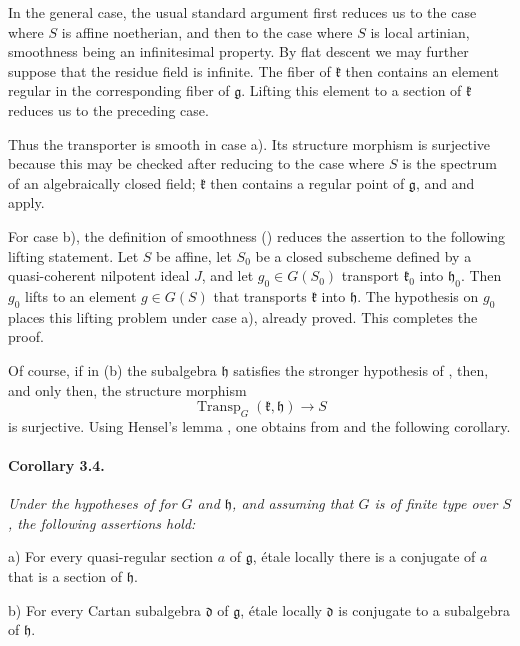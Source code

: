 In the general case, the usual standard argument first reduces us
to the case where \(S\) is affine noetherian, and then to the case
where \(S\) is local artinian, smoothness being an infinitesimal
property. By flat descent we may further suppose that the residue
field is infinite. The fiber of \(\mathfrak k\) then contains an
element regular in the corresponding fiber of \(\mathfrak g\).
Lifting this element to a section of \(\mathfrak k\) reduces us to
the preceding case.

Thus the transporter is smooth in case \textup{a)}. Its structure
morphism is surjective because this may be checked after reducing to
the case where \(S\) is the spectrum of an algebraically closed
field; \(\mathfrak k\) then contains a regular point of
\(\mathfrak g\), and  and  apply.

For case \textup{b)}, the definition of smoothness \textup{()}
reduces the assertion to the following lifting statement. Let \(S\)
be affine, let \(S_0\) be a closed subscheme defined by a
quasi-coherent nilpotent ideal \(J\), and let
\(g_0\in G(S_0)\) transport \(\mathfrak k_0\) into
\(\mathfrak h_0\). Then \(g_0\) lifts to an element \(g\in G(S)\)
that transports \(\mathfrak k\) into \(\mathfrak h\). The
hypothesis on \(g_0\) places this lifting problem under case
\textup{a)}, already proved. This completes the proof.

Of course, if in \textup{(b)} the subalgebra \(\mathfrak h\)
satisfies the stronger hypothesis of , then, and only then, the
structure morphism
\[
  \operatorname{Transp}_G(\mathfrak k,\mathfrak h)
  \longrightarrow S
\]
is surjective. Using Hensel's lemma , one obtains from 
and  the following corollary.



\paragraph{\textbf{Corollary 3.4.}}
{\itshape Under the hypotheses of  for \(G\) and
\(\mathfrak h\), and assuming that \(G\) is of finite type over
\(S\), the following assertions hold:

\smallskip
\noindent
\textup{a)}
For every quasi-regular section \(a\) of \(\mathfrak g\), étale
locally there is a conjugate of \(a\) that is a section of
\(\mathfrak h\).

\smallskip
\noindent
\textup{b)}
For every Cartan subalgebra \(\mathfrak d\) of \(\mathfrak g\),
étale locally \(\mathfrak d\) is conjugate to a subalgebra of
\(\mathfrak h\).}

